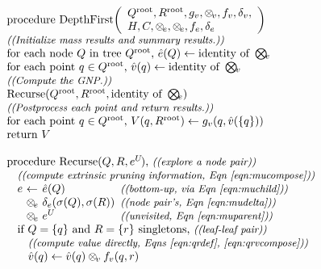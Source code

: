 \documentclass[twoside,leqno,twocolumn]{article}
\newcommand{\com}[1]{{\small \textit{((#1))}}}
\newcommand{\summary}{\delta}
\newcommand{\psty}{}
\newcommand{\X}{\\ \psty}
\newcommand{\x}{\X \hspace{0.13in}}
\newcommand{\xx}{\X \hspace{0.26in}}
\newcommand{\kdroot}[1]{#1^{\text{root}}}
\newcommand{\nameOp}[2]{\mathop{#1\nolimits\!\!_{#2}}}
\newcommand{\nameop}[2]{#1_{\!#2}}
\newcommand{\myOp}[1]{\nameOp{\bigotimes}{#1}}
\newcommand{\myop}[1]{\nameop{\otimes}{#1}}
\newcommand{\letterqr}{v}
\newcommand{\outqr}{V}
\newcommand{\Opqr}{\myOp{\letterqr}}
\newcommand{\opqr}{\myop{\letterqr}}
\newcommand{\fqr}{f_{\letterqr}}
\newcommand{\gqr}{g_{\letterqr}}
\newcommand{\letterqrv}{v}
\newcommand{\deltaqrv}{\summary_{\letterqrv}}
\newcommand{\varqr}{\hat{\letterqr}}
\newcommand{\lettermu}{e}
\newcommand{\inmu}{e}
\newcommand{\outopmu}{\myop{\lettermu}}
\newcommand{\Opmu}{\myOp{\lettermu}}
\newcommand{\opmu}{\myop{\lettermu}}
\newcommand{\fmuv}{f_{\lettermu}}
\newcommand{\deltamu}{\summary_{\lettermu}}
\newcommand{\canprunemu}{C}
\newcommand{\heurqr}{H}
\newcommand{\varmuchild}{\hat{\lettermu}}
\newcommand{\varmuparent}{\lettermu^{U\!}}
\newcommand{\outstat}{\sigma}
\begin{document}
\begin{figure}
  \vspace{-0.3in}
  \[
  \begin{array}[t]{l}
    \\ \text{procedure DepthFirst\!}\left(
        \begin{array}[c]{l}\kdroot{Q}, \kdroot{R}, \gqr, \opqr, \fqr, \deltaqrv, \\ \heurqr, \canprunemu, \outopmu, \opmu, \fmuv, \deltamu\end{array}\right)
    \X \text{\com{Initialize mass results and summary results.}}
    \X \text{for each node } Q \text{ in tree } \kdroot{Q}\text{, } \varmuchild(Q) \gets \text{identity of }\Opmu
    \X \text{for each point } q \in \kdroot{Q}\text{, } \varqr(q) \gets \text{identity of }\Opqr
    \X \text{\com{Compute the GNP.}}
    \X \text{Recurse}(\kdroot{Q}, \kdroot{R}, \text{identity of }\Opmu)
    \X \text{\com{Postprocess each point and return results.}}
    \X \text{for each point } q \in \kdroot{Q}\text{, } \outqr(q, \kdroot{R}) \gets \gqr(q, \varqr(\{q\}))
    \X \text{return }\outqr
    \X
    \X \text{procedure Recurse}(Q, R, \varmuparent)\text{, \com{explore a node pair}}
    \x \text{\com{compute extrinsic pruning information, Eqn~\ref{eqn:mucompose}}}
    \x \!\!\!\begin{array}{llll}
         \psty\lettermu &\psty\!\!\!\!\gets\!\!\!\!& \psty\varmuchild(Q)                     & \!\!\!\text{\com{bottom-up, via Eqn~\ref{eqn:muchild}}}
         \\             &\psty\!\!\!\!\opmu\!\!\!\!& \psty\deltamu(\outstat(Q), \outstat(R)) & \!\!\!\text{\com{node pair's, Eqn~\ref{eqn:mudelta}}}
         \\             &\psty\!\!\!\!\opmu\!\!\!\!& \psty\varmuparent                       & \!\!\!\text{\com{unvisited, Eqn~\ref{eqn:muparent}}}
       \end{array}
    \x \text{if } Q = \{q\}\text{ and }R = \{r\}\text{ singletons, \com{leaf-leaf pair}}
    \xx \text{\com{compute value directly, Eqns \ref{eqn:qrdef}, \ref{eqn:qrvcompose}}}
    \xx \varqr(q) \gets \varqr(q) \opqr \fqr(q, r)

\end{array}\]
\end{figure}
\end{document}
